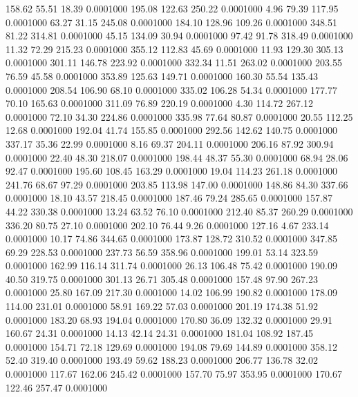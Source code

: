  158.62   55.51   18.39   0.0001000
 195.08  122.63  250.22   0.0001000
   4.96   79.39  117.95   0.0001000
  63.27   31.15  245.08   0.0001000
 184.10  128.96  109.26   0.0001000
 348.51   81.22  314.81   0.0001000
  45.15  134.09   30.94   0.0001000
  97.42   91.78  318.49   0.0001000
  11.32   72.29  215.23   0.0001000
 355.12  112.83   45.69   0.0001000
  11.93  129.30  305.13   0.0001000
 301.11  146.78  223.92   0.0001000
 332.34   11.51  263.02   0.0001000
 203.55   76.59   45.58   0.0001000
 353.89  125.63  149.71   0.0001000
 160.30   55.54  135.43   0.0001000
 208.54  106.90   68.10   0.0001000
 335.02  106.28   54.34   0.0001000
 177.77   70.10  165.63   0.0001000
 311.09   76.89  220.19   0.0001000
   4.30  114.72  267.12   0.0001000
  72.10   34.30  224.86   0.0001000
 335.98   77.64   80.87   0.0001000
  20.55  112.25   12.68   0.0001000
 192.04   41.74  155.85   0.0001000
 292.56  142.62  140.75   0.0001000
 337.17   35.36   22.99   0.0001000
   8.16   69.37  204.11   0.0001000
 206.16   87.92  300.94   0.0001000
  22.40   48.30  218.07   0.0001000
 198.44   48.37   55.30   0.0001000
  68.94   28.06   92.47   0.0001000
 195.60  108.45  163.29   0.0001000
  19.04  114.23  261.18   0.0001000
 241.76   68.67   97.29   0.0001000
 203.85  113.98  147.00   0.0001000
 148.86   84.30  337.66   0.0001000
  18.10   43.57  218.45   0.0001000
 187.46   79.24  285.65   0.0001000
 157.87   44.22  330.38   0.0001000
  13.24   63.52   76.10   0.0001000
 212.40   85.37  260.29   0.0001000
 336.20   80.75   27.10   0.0001000
 202.10   76.44    9.26   0.0001000
 127.16    4.67  233.14   0.0001000
  10.17   74.86  344.65   0.0001000
 173.87  128.72  310.52   0.0001000
 347.85   69.29  228.53   0.0001000
 237.73   56.59  358.96   0.0001000
 199.01   53.14  323.59   0.0001000
 162.99  116.14  311.74   0.0001000
  26.13  106.48   75.42   0.0001000
 190.09   40.50  319.75   0.0001000
 301.13   26.71  305.48   0.0001000
 157.48   97.90  267.23   0.0001000
  25.80  167.09  217.30   0.0001000
  14.02  106.99  190.82   0.0001000
 178.09  114.00  231.01   0.0001000
  58.91  169.22   57.03   0.0001000
 201.19  174.38   51.92   0.0001000
 183.20   68.93  194.04   0.0001000
 170.80   36.09  132.32   0.0001000
  29.91  160.67   24.31   0.0001000
  14.13   42.14   24.31   0.0001000
 181.04  108.92  187.45   0.0001000
 154.71   72.18  129.69   0.0001000
 194.08   79.69  144.89   0.0001000
 358.12   52.40  319.40   0.0001000
 193.49   59.62  188.23   0.0001000
 206.77  136.78   32.02   0.0001000
 117.67  162.06  245.42   0.0001000
 157.70   75.97  353.95   0.0001000
 170.67  122.46  257.47   0.0001000
